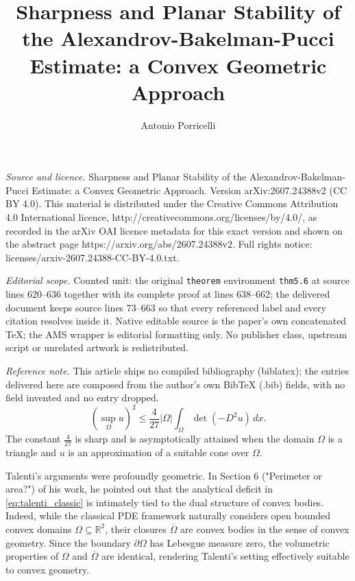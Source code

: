 \documentclass[10pt,a4paper]{amsart}
\numberwithin{equation}{section}
\begin{document}
\title[Sharpness and Planar Stability of the Alexandrov-Bakelman-Pu]{Sharpness and Planar Stability of the Alexandrov-Bakelman-Pucci Estimate: a Convex Geometric Approach}
\author{Antonio Porricelli}
\date{}
\maketitle
\noindent\emph{Source and licence.} Sharpness and Planar Stability of the Alexandrov-Bakelman-Pucci Estimate: a Convex Geometric Approach. Version arXiv:2607.24388v2 (CC BY 4.0). This material is distributed under the Creative Commons Attribution 4.0 International licence, http://creativecommons.org/licenses/by/4.0/, as recorded in the arXiv OAI licence metadata for this exact version and shown on the abstract page https://arxiv.org/abs/2607.24388v2. Full rights notice: licenses/arxiv-2607.24388-CC-BY-4.0.txt.\par\smallskip
\noindent\textit{Editorial scope.} Counted unit: the original \texttt{theorem} environment \texttt{thm5.6} at source lines 620--636 together with its complete proof at lines 638--662; the delivered document keeps source lines 73--663 so that every referenced label and every citation resolves inside it. Native editable source is the paper's own concatenated TeX; the AMS wrapper is editorial formatting only. No publisher class, upstream script or unrelated artwork is redistributed.
\par\smallskip\noindent\textit{Reference note.} This article ships no compiled bibliography (biblatex); the entries delivered here are composed from the author's own BibTeX (.bib) fields, with no field invented and no entry dropped.
\begin{equation}\label{eq:talenti_classic}
(\sup_\Omega u)^2 \leq \frac{4}{27}|\Omega|\int_\Omega \det (-D^2u) \, dx.
\end{equation}
The constant $\frac{4}{27}$ is sharp and is asymptotically attained when the domain $\Omega$ is a triangle and $u$ is an approximation of a suitable cone over $\Omega$. 

\noindent Talenti's arguments were profoundly geometric. In Section 6 ("Perimeter or area?") of his work, he pointed out that the analytical deficit in \eqref{eq:talenti_classic} is intimately tied to the dual structure of convex bodies. Indeed, while the classical PDE framework naturally considers open bounded convex domains $\Omega \subseteq \mathbb{R}^2$, their closures $\overline{\Omega}$ are convex bodies in the sense of convex geometry. Since the boundary $\partial \Omega$ has Lebesgue measure zero, the volumetric properties of $\Omega$ and $\overline{\Omega}$ are identical, rendering Talenti's setting effectively suitable to convex geometry.
\end{document}

